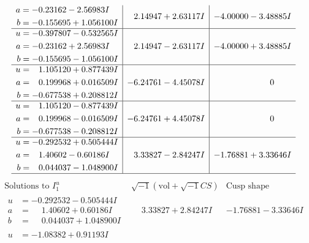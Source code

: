 \documentclass[1p]{elsarticle_modified}
\theoremstyle{definition}
\newcommand{\I}{\sqrt{-1}}
\begin{document}
$$\begin{array}{c|c|c}
\begin{aligned}
a &= -0.23162 - 2.56983 I \\
b &= -0.155695 + 1.056100 I\end{aligned}
 & \phantom{-}2.14947 + 2.63117 I & -4.00000 - 3.48885 I \\ \hline\begin{aligned}
u &= -0.397807 - 0.532565 I \\
a &= -0.23162 + 2.56983 I \\
b &= -0.155695 - 1.056100 I\end{aligned}
 & \phantom{-}2.14947 - 2.63117 I & -4.00000 + 3.48885 I \\ \hline\begin{aligned}
u &= \phantom{-}1.105120 + 0.877439 I \\
a &= \phantom{-}0.199968 + 0.016509 I \\
b &= -0.677538 + 0.208812 I\end{aligned}
 & -6.24761 - 4.45078 I & \phantom{-0.000000 } 0 \\ \hline\begin{aligned}
u &= \phantom{-}1.105120 - 0.877439 I \\
a &= \phantom{-}0.199968 - 0.016509 I \\
b &= -0.677538 - 0.208812 I\end{aligned}
 & -6.24761 + 4.45078 I & \phantom{-0.000000 } 0 \\ \hline\begin{aligned}
u &= -0.292532 + 0.505444 I \\
a &= \phantom{-}1.40602 - 0.60186 I \\
b &= \phantom{-}0.044037 - 1.048900 I\end{aligned}
 & \phantom{-}3.33827 - 2.84247 I & -1.76881 + 3.33646 I\\
 \hline 
 \end{array}$$\newpage$$\begin{array}{c|c|c}  
\text{Solutions to }I^u_{1}& \I (\text{vol} + \sqrt{-1}CS) & \text{Cusp shape}\\
 \hline 
\begin{aligned}
u &= -0.292532 - 0.505444 I \\
a &= \phantom{-}1.40602 + 0.60186 I \\
b &= \phantom{-}0.044037 + 1.048900 I\end{aligned}
 & \phantom{-}3.33827 + 2.84247 I & -1.76881 - 3.33646 I \\ \hline\begin{aligned}
u &= -1.08382 + 0.91193 I \\

\end{aligned}
\end{array}$$
\end{document}
